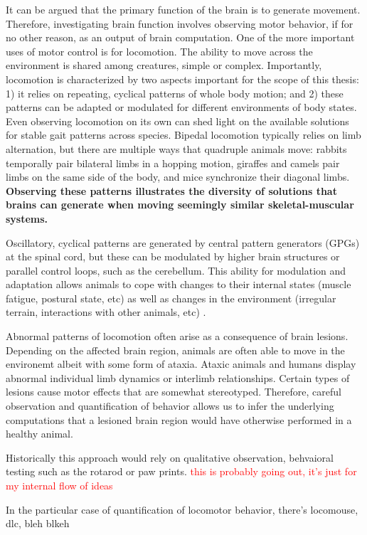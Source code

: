 It can be argued that the primary function of the brain is to generate movement. Therefore, investigating brain function involves observing motor behavior, if for no other reason, as an output of brain computation.
One of the more important uses of motor control is for locomotion. The ability to move across the environment is shared among creatures, simple or complex. Importantly, locomotion is characterized by two aspects important for the scope of this thesis: 1) it relies on repeating, cyclical patterns of whole body motion; and 2) these patterns can be adapted or modulated for different environments of body states. Even observing locomotion on its own can shed light on the available solutions for stable gait patterns across species. Bipedal locomotion typically relies on limb alternation, but there are multiple ways that quadruple animals move: rabbits temporally pair bilateral limbs in a hopping motion, giraffes and camels pair limbs on the same side of the body, and mice synchronize their diagonal limbs. \textbf{Observing these patterns illustrates the diversity of solutions that brains can generate when moving seemingly similar skeletal-muscular systems.} 

Oscillatory, cyclical patterns are generated by central pattern generators (GPGs) at the spinal cord, but these can be modulated by higher brain structures or parallel control loops, such as the cerebellum. This ability for modulation and adaptation allows animals to cope with changes to their internal states (muscle fatigue, postural state, etc) as well as changes in the environment (irregular terrain, interactions with other animals, etc) \cite{grilner}.

Abnormal patterns of locomotion often arise as a consequence of brain lesions. Depending on the affected brain region, animals are often able to move in the environemt albeit with some form of ataxia. Ataxic animals and humans display abnormal individual limb dynamics or interlimb relationships. Certain types of lesions cause motor effects that are somewhat stereotyped. Therefore, careful observation and quantification of behavior allows us to infer the underlying computations that a lesioned brain region would have otherwise performed in a healthy animal.

Historically this approach would rely on qualitative observation, behvaioral testing such as the rotarod or paw prints. \textcolor{red}{this is probably going out, it's just for my internal flow of ideas}

In the particular case of quantification of locomotor behavior, there's locomouse, dlc, bleh blkeh

